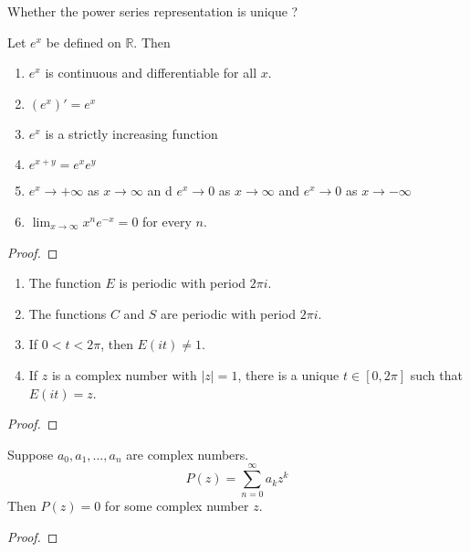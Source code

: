 \begin{doubt}
Whether the power series representation is unique ?
\end{doubt}

\begin{theorem}
	Let $e^x$ be defined on $\mathbb{R}$.
	Then
	\begin{enumerate}
		\item $e^x$ is continuous and differentiable for all $x$.
		\item $(e^x)' = e^x$
		\item $e^x$ is a strictly increasing function
		\item $e^{x+y} = e^x e^y$
		\item $e^x \to +\infty$ as $x \to \infty$ an d $e^x \to 0$ as $x \to \infty$ and $e^x \to 0$ as $x \to -\infty$
		\item $\displaystyle \lim_{x \to \infty} x^ne^{-x} = 0$ for every $n$.
	\end{enumerate}
\end{theorem}
\begin{proof}
\end{proof}

\begin{theorem}
	\begin{enumerate}
		\item The function $E$ is periodic with period $2\pi i$.
		\item The functions $C$ and $S$ are periodic with period $2\pi i$.
		\item If $0 < t < 2\pi$, then $E(it) \ne 1$.
		\item If $z$ is a complex number with $|z| =1$, there is a unique $t \in [0,2\pi]$ such that $E(it) = z$.
	\end{enumerate}
\end{theorem}
\begin{proof}
\end{proof}

\begin{theorem}
	Suppose $a_0,a_1,\dots,a_n$ are complex numbers.
	\[ P(z) = \sum_{n=0}^\infty a_k z^k \]
	Then $P(z) = 0$ for some complex number $z$.
\end{theorem}
\begin{proof}
\end{proof}


